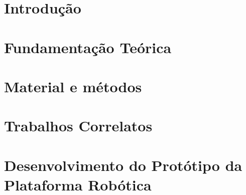 \documentclass[tcc,baec]{unipampa}
\begin{document}
% 
%

\tableofcontents

% 
%


\chapter{Introdução}
\label{cap-introducao}


\chapter{Fundamentação Teórica}
\label{cap-fundamentacao-teorica}


\chapter{Material e métodos}
\label{cap-metodologia}


\chapter{Trabalhos Correlatos}
\label{cap-trabalhos-relacionados}


\chapter{Desenvolvimento do Protótipo da Plataforma Robótica}
\label{cap-desenvolvimento}

\end{document}
